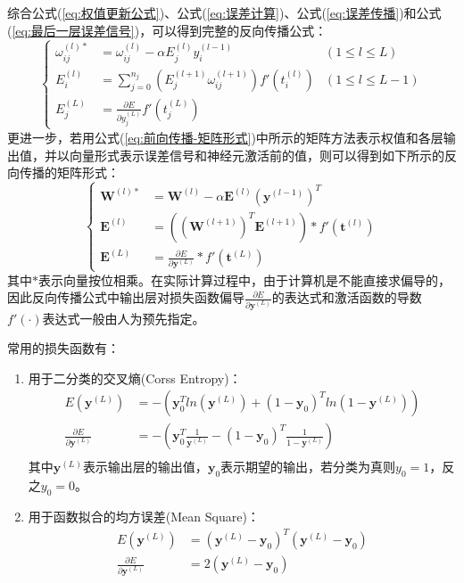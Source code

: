 \documentclass[a4paper]{ctexart}
\begin{document}
\begin{spacing}{1.3}
	综合公式(\ref{eq:权值更新公式})、公式(\ref{eq:误差计算})、公式(\ref{eq:误差传播})和公式(\ref{eq:最后一层误差信号})，可以得到完整的反向传播公式：
	\begin{equation}
			\left\{
				\begin{aligned}
					\omega_{ij}^{(l)*}&=\omega_{ij}^{(l)}-\alpha E_j^{(l)}y_i^{(l-1)}&(1\leq l\leq L)\\
					E_i^{(l)}&=\sum_{j=0}^{n_{j}}\left(E_j^{(l+1)}\omega_{ij}^{(l+1)}\right)f'\left(t_i^{(l)}\right)&(1\leq l\leq L-1)\\
					E_j^{(L)}&=\frac{\partial E}{\partial y_j^{(L)}}f'\left(t_j^{(L)}\right)&
				\end{aligned}
			\right.
	\end{equation}
	更进一步，若用公式(\ref{eq:前向传播-矩阵形式})中所示的矩阵方法表示权值和各层输出值，并以向量形式表示误差信号和神经元激活前的值，则可以得到如下所示的反向传播的矩阵形式：
	\begin{equation}
		\left\{
				\begin{aligned}
					\bm{W}^{(l)*}&=\bm{W}^{(l)}-\alpha\bm{E}^{(l)}(\bm{y}^{(l-1)})^T\\
					\bm{E}^{(l)}&=\left((\bm{W}^{(l+1)})^T\bm{E}^{(l+1)}\right)*f'\left(\bm{t}^{(l)}\right)\\
					\bm{E}^{(L)}&=\frac{\partial E}{\partial \bm{y}^{(L)}}*f'\left(\bm{t}^{(L)}\right)
				\end{aligned}
			\right.
	\end{equation}
	其中$*$表示向量按位相乘。在实际计算过程中，由于计算机是不能直接求偏导的，因此反向传播公式中输出层对损失函数偏导$\frac{\partial E}{\partial \bm{y}^{(L)}}$的表达式和激活函数的导数$f'(\cdot)$表达式一般由人为预先指定。
	
	常用的损失函数有：
	\begin{enumerate}[itemindent=2em,label=(\arabic*)]
		\item 用于二分类的交叉熵(Corss Entropy)：
		\begin{equation}
			\begin{split}
				E(\bm y^{(L)})&=-\left(\bm y_0^Tln(\bm y^{(L)})+(1-\bm y_0)^Tln(1-\bm y^{(L)})\right)\\
				\frac{\partial E}{\partial \bm{y}^{(L)}}&=-\left(\bm y_0^T\frac{1}{\bm y^{(L)}}-(1-\bm y_0)^T\frac{1}{1-\bm y^{(L)}}\right)\\
			\end{split}
		\end{equation}
		其中$\bm y^{(L)}$表示输出层的输出值，$\bm{y}_0$表示期望的输出，若分类为真则$y_0=1$，反之$y_0=0$。
		\item 用于函数拟合的均方误差(Mean Square)：
		\begin{equation}
			\begin{split}
				E(\bm y^{(L)})&=(\bm y^{(L)}-\bm y_0)^T(\bm y^{(L)}-\bm y_0)\\
				\frac{\partial E}{\partial \bm{y}^{(L)}}&=2(\bm y^{(L)}-\bm y_0)\\
			\end{split}
		\end{equation}
	\end{enumerate}


\end{spacing}
\end{document}
